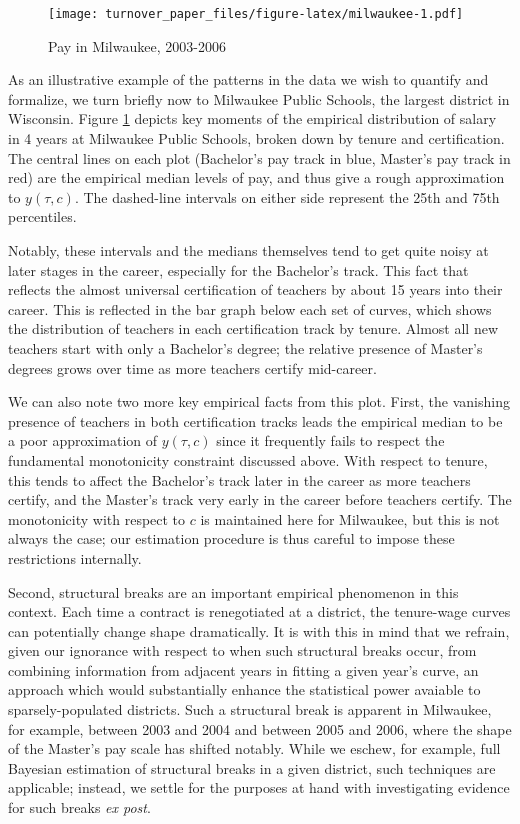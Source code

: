 \documentclass[12pt,]{article}
\begin{document}
\begin{figure}[htbp]
\centering
\texttt{[image: turnover\_paper\_files/figure-latex/milwaukee-1.pdf]}
\caption{\label{fig:mwk}Pay in Milwaukee, 2003-2006}
\end{figure}

As an illustrative example of the patterns in the data we wish to
quantify and formalize, we turn briefly now to Milwaukee Public Schools,
the largest district in Wisconsin. Figure \ref{fig:mwk} depicts key
moments of the empirical distribution of salary in 4 years at Milwaukee
Public Schools, broken down by tenure and certification. The central
lines on each plot (Bachelor's pay track in blue, Master's pay track in
red) are the empirical median levels of pay, and thus give a rough
approximation to \(y(\tau, c)\). The dashed-line intervals on either
side represent the 25th and 75th percentiles.

Notably, these intervals and the medians themselves tend to get quite
noisy at later stages in the career, especially for the Bachelor's
track. This fact that reflects the almost universal certification of
teachers by about 15 years into their career. This is reflected in the
bar graph below each set of curves, which shows the distribution of
teachers in each certification track by tenure. Almost all new teachers
start with only a Bachelor's degree; the relative presence of Master's
degrees grows over time as more teachers certify mid-career.

We can also note two more key empirical facts from this plot. First, the
vanishing presence of teachers in both certification tracks leads the
empirical median to be a poor approximation of \(y(\tau, c)\) since it
frequently fails to respect the fundamental monotonicity constraint
discussed above. With respect to tenure, this tends to affect the
Bachelor's track later in the career as more teachers certify, and the
Master's track very early in the career before teachers certify. The
monotonicity with respect to \(c\) is maintained here for Milwaukee, but
this is not always the case; our estimation procedure is thus careful to
impose these restrictions internally.

Second, structural breaks are an important empirical phenomenon in this
context. Each time a contract is renegotiated at a district, the
tenure-wage curves can potentially change shape dramatically. It is with
this in mind that we refrain, given our ignorance with respect to when
such structural breaks occur, from combining information from adjacent
years in fitting a given year's curve, an approach which would
substantially enhance the statistical power avaiable to
sparsely-populated districts. Such a structural break is apparent in
Milwaukee, for example, between 2003 and 2004 and between 2005 and 2006,
where the shape of the Master's pay scale has shifted notably. While we
eschew, for example, full Bayesian estimation of structural breaks in a
given district, such techniques are applicable; instead, we settle for
the purposes at hand with investigating evidence for such breaks
\emph{ex post}.
\end{document}
